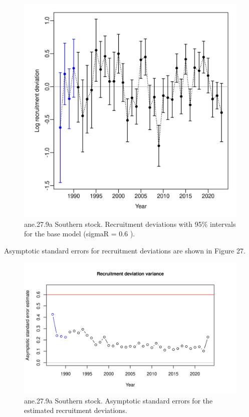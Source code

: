 \documentclass[
]{article}
\begin{document}
\begin{figure}[H]

{\centering \includegraphics[width=0.95\linewidth]{report/run/S1.0_4FLEETS_SelECO_RecIndex_Mnewfix/fig_Recdevs} 

}

\caption{ane.27.9a Southern stock. Recruitment deviations with 95\% intervals for the base model (sigmaR = 0.6 ).}\label{fig:unnamed-chunk-58}
\end{figure}

Asymptotic standard errors for recruitment deviations are shown in
Figure 27.

\begin{figure}[H]

{\centering \includegraphics[width=0.95\linewidth]{report/run/S1.0_4FLEETS_SelECO_RecIndex_Mnewfix/fig_recdevs2_varcheck} 

}

\caption{ane.27.9a Southern stock. Asymptotic standard errors for the estimated recruitment deviations.}\label{fig:unnamed-chunk-59}
\end{figure}
\end{document}
